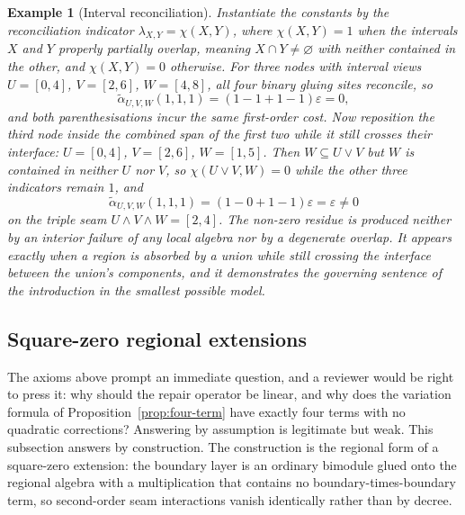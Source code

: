 \documentclass[11pt]{article}
\newtheorem{example}[theorem]{Example}
\begin{document}
\begin{example}[Interval reconciliation]
\label{ex:interval}
Instantiate the constants by the reconciliation indicator \(\lambda_{X,Y}=\chi(X,Y)\), where \(\chi(X,Y)=1\) when the intervals \(X\) and \(Y\) properly partially overlap, meaning \(X\cap Y\neq\varnothing\) with neither contained in the other, and \(\chi(X,Y)=0\) otherwise. For three nodes with interval views \(U=[0,4]\), \(V=[2,6]\), \(W=[4,8]\), all four binary gluing sites reconcile, so
\[
\widetilde\alpha_{U,V,W}(1,1,1)=(1-1+1-1)\varepsilon=0,
\]
and both parenthesisations incur the same first-order cost. Now reposition the third node inside the combined span of the first two while it still crosses their interface: \(U=[0,4]\), \(V=[2,6]\), \(W=[1,5]\). Then \(W\subseteq U\vee V\) but \(W\) is contained in neither \(U\) nor \(V\), so \(\chi(U\vee V,W)=0\) while the other three indicators remain \(1\), and
\[
\widetilde\alpha_{U,V,W}(1,1,1)=(1-0+1-1)\varepsilon=\varepsilon\neq 0
\]
on the triple seam \(U\wedge V\wedge W=[2,4]\). The non-zero residue is produced neither by an interior failure of any local algebra nor by a degenerate overlap. It appears exactly when a region is absorbed by a union while still crossing the interface between the union's components, and it demonstrates the governing sentence of the introduction in the smallest possible model.
\end{example}

\subsection{Square-zero regional extensions}
\label{sec:square-zero}

The axioms above prompt an immediate question, and a reviewer would be right to press it: why should the repair operator be linear, and why does the variation formula of Proposition~\ref{prop:four-term} have exactly four terms with no quadratic corrections? Answering by assumption is legitimate but weak. This subsection answers by construction. The construction is the regional form of a square-zero extension: the boundary layer is an ordinary bimodule glued onto the regional algebra with a multiplication that contains no boundary-times-boundary term, so second-order seam interactions vanish identically rather than by decree.
\end{document}
